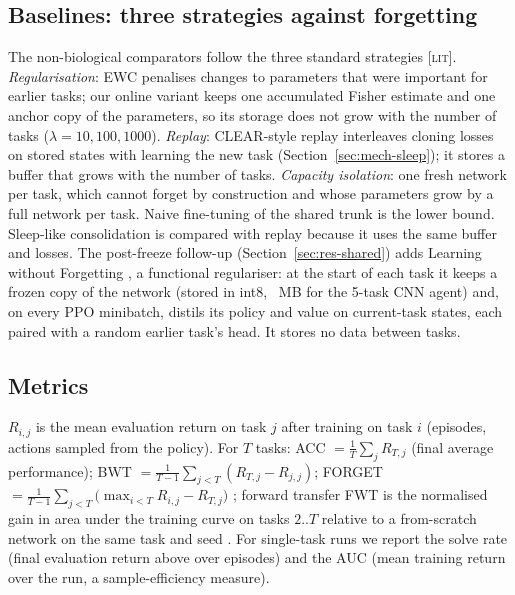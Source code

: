 \documentclass[10pt]{article}
\newcommand{\lit}{\textsc{[lit]}\xspace}
\begin{document}
\subsection{Baselines: three strategies against forgetting}
\label{sec:baselines}
The non-biological comparators follow the three standard strategies \lit \citep{khetarpal2022towards}.
\emph{Regularisation}: EWC \citep{kirkpatrick2017overcoming} penalises changes to parameters that were important for
earlier tasks; our online variant keeps one accumulated Fisher estimate and one anchor copy of the parameters, so its
storage does not grow with the number of tasks ($\lambda=10,100,1000$). \emph{Replay}: CLEAR-style replay
\citep{rolnick2019experience} interleaves cloning losses on stored states with learning the new task
(Section~\ref{sec:mech-sleep}); it stores a buffer that grows with the number of tasks. \emph{Capacity isolation}: one
fresh network per task, which cannot forget by construction and whose parameters grow by a full network per task.
Naive fine-tuning of the shared trunk is the lower bound. Sleep-like consolidation is compared with replay because it
uses the same buffer and losses. The post-freeze follow-up (Section~\ref{sec:res-shared}) adds Learning without
Forgetting \citep[LwF;][]{li2017learning}, a functional regulariser: at the start of each task it keeps a frozen copy of
the network (stored in int8, \postSnapshotMb~MB for the 5-task CNN agent) and, on every PPO minibatch, distils its
policy and value on \postLwfBatch current-task states, each paired with a random earlier task's head. It stores no
data between tasks.

\subsection{Metrics}
$R_{i,j}$ is the mean evaluation return on task $j$ after training on task $i$ (\evalEpisodesCl episodes, actions
sampled from the policy). For $T$ tasks: ACC $=\frac1T\sum_j R_{T,j}$ (final average performance); BWT
$=\frac{1}{T-1}\sum_{j<T} (R_{T,j}-R_{j,j})$; FORGET $=\frac{1}{T-1}\sum_{j<T}\big(\max_{i<T}R_{i,j}-R_{T,j}\big)$
\citep{chaudhry2018riemannian}; forward transfer FWT is the normalised gain in area under the training curve on
tasks $2..T$ relative to a from-scratch network on the same task and seed \citep{wolczyk2021continual}. For single-task
runs we report the solve rate (final evaluation return above \solveThreshold over \evalEpisodesSingle episodes) and
the AUC (mean training return over the run, a sample-efficiency measure).
\end{document}
